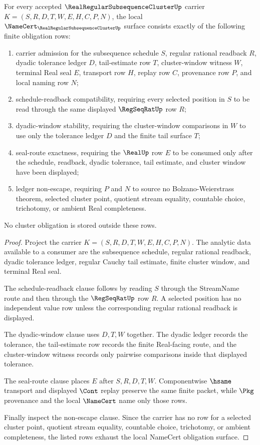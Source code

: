 \begin{theorem}
\label{thm:real-regular-subsequence-cluster-namecert-obligations}
For every accepted $\RealRegularSubsequenceClusterUp$ carrier $K=(S,R,D,T,W,E,H,C,P,N)$, the local $\NameCert_{\RealRegularSubsequenceClusterUp}$ surface consists exactly of the following finite obligation rows:
\begin{enumerate}
\item carrier admission for the subsequence schedule $S$, regular rational readback $R$, dyadic tolerance ledger $D$, tail-estimate row $T$, cluster-window witness $W$, terminal Real seal $E$, transport row $H$, replay row $C$, provenance row $P$, and local naming row $N$;
\item schedule-readback compatibility, requiring every selected position in $S$ to be read through the same displayed $\RegSeqRatUp$ row $R$;
\item dyadic-window stability, requiring the cluster-window comparisons in $W$ to use only the tolerance ledger $D$ and the finite tail surface $T$;
\item seal-route exactness, requiring the $\RealUp$ row $E$ to be consumed only after the schedule, readback, dyadic tolerance, tail estimate, and cluster window have been displayed;
\item ledger non-escape, requiring $P$ and $N$ to source no Bolzano-Weierstrass theorem, selected cluster point, quotient stream equality, countable choice, trichotomy, or ambient Real completeness.
\end{enumerate}
No cluster obligation is stored outside these rows.
\end{theorem}
\begin{proof}
Project the carrier $K=(S,R,D,T,W,E,H,C,P,N)$. The analytic data available to a consumer are the subsequence schedule, regular rational readback, dyadic tolerance ledger, regular Cauchy tail estimate, finite cluster window, and terminal Real seal.

The schedule-readback clause follows by reading $S$ through the StreamName route and then through the $\RegSeqRatUp$ row $R$. A selected position has no independent value row unless the corresponding regular rational readback is displayed.

The dyadic-window clause uses $D,T,W$ together. The dyadic ledger records the tolerance, the tail-estimate row records the finite Real-facing route, and the cluster-window witness records only pairwise comparisons inside that displayed tolerance.

The seal-route clause places $E$ after $S,R,D,T,W$. Componentwise $\hsame$ transport and displayed $\Cont$ replay preserve the same finite packet, while $\Pkg$ provenance and the local $\NameCert$ name only those rows.

Finally inspect the non-escape clause. Since the carrier has no row for a selected cluster point, quotient stream equality, countable choice, trichotomy, or ambient completeness, the listed rows exhaust the local NameCert obligation surface.
\end{proof}

